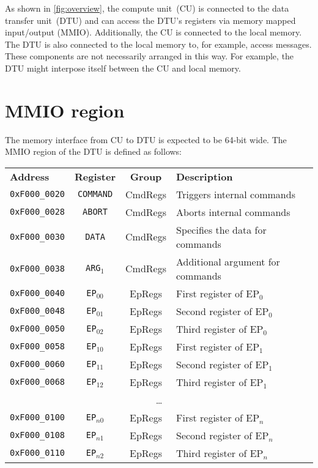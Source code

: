 \documentclass[a4paper,11pt,draft]{article}
\newcommand{\rref}[2][]{\autoref{#2}}
\begin{document}
As shown in \rref{fig:overview}, the compute unit~(CU) is connected to the data transfer unit~(DTU)
and can access the DTU's registers via memory mapped input/output (MMIO). Additionally, the CU is
connected to the local memory. The DTU is also connected to the local memory to, for example, access
messages. These components are not necessarily arranged in this way. For example, the DTU might
interpose itself between the CU and local memory.

\section{MMIO region}

The memory interface from CU to DTU is expected to be 64-bit wide. The MMIO region of the DTU is
defined as follows:

\vspace{2ex}
\noindent
\begin{tabular}{ p{3cm} | c | c | l }
  \textbf{Address} & \textbf{Register} & \textbf{Group} & \textbf{Description} \\
  \texttt{0xF000\_0020} & \texttt{COMMAND} & CmdRegs & Triggers internal commands \\
  \hline
  \texttt{0xF000\_0028} & \texttt{ABORT} & CmdRegs & Aborts internal commands \\
  \hline
  \texttt{0xF000\_0030} & \texttt{DATA} & CmdRegs & Specifies the data for commands \\
  \hline
  \texttt{0xF000\_0038} & \texttt{ARG$_1$} & CmdRegs & Additional argument for commands \\
  \hline
  \texttt{0xF000\_0040} & \texttt{EP$_{00}$} & EpRegs & First register of EP$_0$ \\
  \texttt{0xF000\_0048} & \texttt{EP$_{01}$} & EpRegs & Second register of EP$_0$ \\
  \texttt{0xF000\_0050} & \texttt{EP$_{02}$} & EpRegs & Third register of EP$_0$ \\
  \hline
  \texttt{0xF000\_0058} & \texttt{EP$_{10}$} & EpRegs & First register of EP$_1$ \\
  \texttt{0xF000\_0060} & \texttt{EP$_{11}$} & EpRegs & Second register of EP$_1$ \\
  \texttt{0xF000\_0068} & \texttt{EP$_{12}$} & EpRegs & Third register of EP$_1$ \\
  \hline
  \multicolumn{4}{c}{\dots} \\
  \hline
  \texttt{0xF000\_0100} & \texttt{EP$_{n0}$} & EpRegs & First register of EP$_{n}$ \\
  \texttt{0xF000\_0108} & \texttt{EP$_{n1}$} & EpRegs & Second register of EP$_{n}$ \\
  \texttt{0xF000\_0110} & \texttt{EP$_{n2}$} & EpRegs & Third register of EP$_{n}$ \\
\end{tabular}
\end{document}
